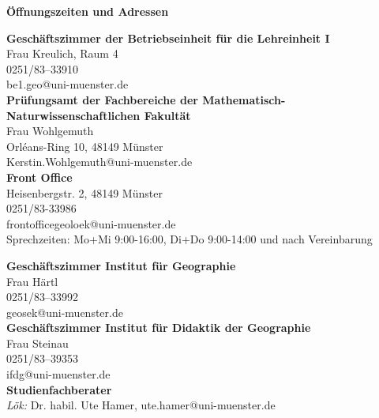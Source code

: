 \begin{center}
\textbf{ Öffnungszeiten und Adressen}
\end{center}
\begin{tiny}
\sffamily
\begin{minipage}[t]{0.5\textwidth}
 \begin{center}
\textbf{Geschäftszimmer der Betriebseinheit für die Lehreinheit I}\\
Frau Kreulich, Raum 4\\
0251/83--33910 \\
be1.geo@uni-muenster.de\\
\bigskip
\textbf{Prüfungsamt der Fachbereiche der Mathematisch- Naturwissenschaftlichen Fakultät}\\
Frau Wohlgemuth\\
Orléans-Ring 10, 48149 Münster\\
Kerstin.Wohlgemuth@uni-muenster.de\\
\bigskip
\textbf{Front Office}\\
Heisenbergstr. 2, 48149 Münster\\
0251/83-33986\\
frontofficegeoloek@uni-muenster.de\\
Sprechzeiten: Mo+Mi 9:00-16:00, Di+Do 9:00-14:00 und nach Vereinbarung
\bigskip
\end{center}
\end{minipage}
\begin{minipage}[t]{0.5\textwidth}
\begin{center}
 \textbf{Geschäftszimmer Institut für Geographie}\\
  Frau Härtl\\
  0251/83--33992\\
  geosek@uni-muenster.de\\
 \bigskip
\textbf{Geschäftszimmer Institut für Didaktik der Geographie}\\
Frau Steinau\\
0251/83--39353\\
ifdg@uni-muenster.de\\
\bigskip
\textbf{Studienfachberater}\\
\textit{Lök:} Dr. habil. Ute Hamer, ute.hamer@uni-muenster.de\\

\end{center}
\end{minipage}
\end{tiny}
